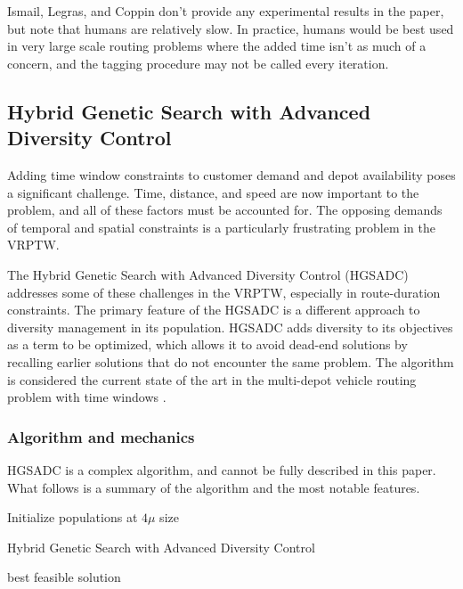 \documentclass{sig-alternate}
\begin{document}
Ismail, Legras, and Coppin don't provide any experimental results in the paper, but note that humans are relatively slow. In practice, humans would be best used in very large scale routing problems where the added time isn't as much of a concern, and the tagging procedure may not be called every iteration. 

\subsection{Hybrid Genetic Search with Advanced Diversity Control}
Adding time window constraints to customer demand and depot availability poses a significant challenge. Time, distance, and speed are now important to the problem, and all of these factors must be accounted for. The opposing demands of temporal and spatial constraints is a particularly frustrating problem in the VRPTW. 

The Hybrid Genetic Search with Advanced Diversity Control (HGSADC) addresses some of these challenges in the VRPTW, especially in route-duration constraints. The primary feature of the HGSADC is a different approach to diversity management in its population. HGSADC adds diversity to its objectives as a term to be optimized, which allows it to avoid dead-end solutions by recalling earlier solutions that do not encounter the same problem. The algorithm is considered the current state of the art in the multi-depot vehicle routing problem with time windows \cite{Vidal:2013}.

\subsubsection{Algorithm and mechanics}
HGSADC is a complex algorithm, and cannot be fully described in this paper. What follows is a summary of the algorithm and the most notable features.

\begin{algorithm}[h]
Initialize populations at $4\mu$ size\;
\caption{Hybrid Genetic Search with Advanced Diversity Control\label{HGSADC}}
\Return best feasible solution\;
\end{algorithm}
\end{document}
